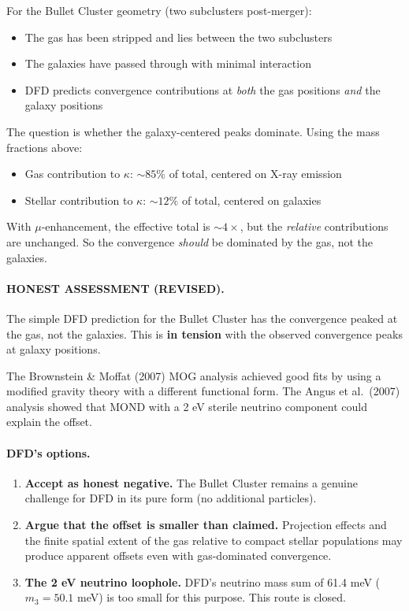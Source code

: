 \documentclass[11pt,a4paper]{article}
\begin{document}
For the Bullet Cluster geometry (two subclusters post-merger):
\begin{itemize}
\item The gas has been stripped and lies between the two subclusters
\item The galaxies have passed through with minimal interaction
\item DFD predicts convergence contributions at \emph{both} the gas
  positions \emph{and} the galaxy positions
\end{itemize}

The question is whether the galaxy-centered peaks dominate.  Using
the mass fractions above:
\begin{itemize}
\item Gas contribution to $\kappa$: $\sim 85\%$ of total, centered
  on X-ray emission
\item Stellar contribution to $\kappa$: $\sim 12\%$ of total, centered
  on galaxies
\end{itemize}

With $\mu$-enhancement, the effective total is $\sim 4\times$, but
the \emph{relative} contributions are unchanged.  So the convergence
\emph{should} be dominated by the gas, not the galaxies.

\paragraph{HONEST ASSESSMENT (REVISED).}
The simple DFD prediction for the Bullet Cluster has the convergence
peaked at the gas, not the galaxies.  This is \textbf{in tension}
with the observed convergence peaks at galaxy positions.

The Brownstein \& Moffat (2007) MOG analysis achieved good fits by
using a modified gravity theory with a different functional form.
The Angus et al.\ (2007) analysis showed that MOND with a 2 eV
sterile neutrino component could explain the offset.

\paragraph{DFD's options.}
\begin{enumerate}
\item \textbf{Accept as honest negative.}  The Bullet Cluster remains
  a genuine challenge for DFD in its pure form (no additional particles).
\item \textbf{Argue that the offset is smaller than claimed.}
  Projection effects and the finite spatial extent of the gas relative
  to compact stellar populations may produce apparent offsets even with
  gas-dominated convergence.
\item \textbf{The 2 eV neutrino loophole.}  DFD's neutrino mass sum
  of 61.4 meV ($m_3 = 50.1$ meV) is too small for this purpose.
  This route is closed.
\end{enumerate}
\end{document}
